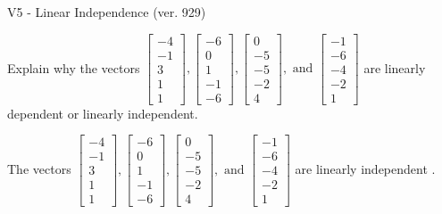 \begin{exercise}
  \begin{exerciseTitle}V5 - Linear Independence (ver. 929)\end{exerciseTitle}
  \begin{exerciseStatement}
    Explain why the vectors \(\left[\begin{array}{r}
-4 \\
-1 \\
3 \\
1 \\
1
\end{array}\right] , \left[\begin{array}{r}
-6 \\
0 \\
1 \\
-1 \\
-6
\end{array}\right] , \left[\begin{array}{r}
0 \\
-5 \\
-5 \\
-2 \\
4
\end{array}\right] , \text{ and } \left[\begin{array}{r}
-1 \\
-6 \\
-4 \\
-2 \\
1
\end{array}\right]\) are linearly dependent or linearly independent.	


  \end{exerciseStatement}
  \begin{exerciseAnswer}
   The vectors \(\left[\begin{array}{r}
-4 \\
-1 \\
3 \\
1 \\
1
\end{array}\right] , \left[\begin{array}{r}
-6 \\
0 \\
1 \\
-1 \\
-6
\end{array}\right] , \left[\begin{array}{r}
0 \\
-5 \\
-5 \\
-2 \\
4
\end{array}\right] , \text{ and } \left[\begin{array}{r}
-1 \\
-6 \\
-4 \\
-2 \\
1
\end{array}\right]\) are 
  	 linearly independent  .
  


  \end{exerciseAnswer}
\end{exercise}